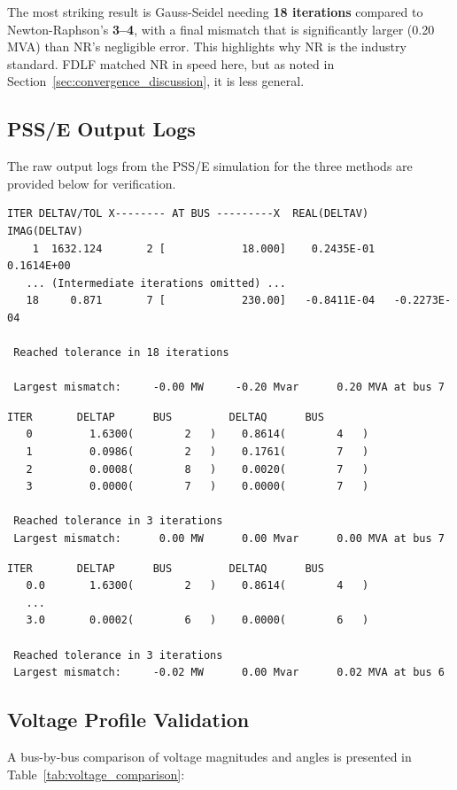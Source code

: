 \documentclass[12pt, a4paper]{article}
\begin{document}
The most striking result is Gauss-Seidel needing \textbf{18 iterations} compared to Newton-Raphson's \textbf{3--4}, with a final mismatch that is significantly larger (0.20 MVA) than NR's negligible error. This highlights why NR is the industry standard. FDLF matched NR in speed here, but as noted in Section~\ref{sec:convergence_discussion}, it is less general.

\subsection{PSS/E Output Logs}
The raw output logs from the PSS/E simulation for the three methods are provided below for verification.

\begin{lstlisting}[caption={PSS/E Gauss-Seidel Output}, label={lst:psse_gs}]
 ITER DELTAV/TOL X-------- AT BUS ---------X  REAL(DELTAV)  IMAG(DELTAV)
    1  1632.124       2 [            18.000]    0.2435E-01    0.1614E+00
   ... (Intermediate iterations omitted) ...
   18     0.871       7 [            230.00]   -0.8411E-04   -0.2273E-04

 Reached tolerance in 18 iterations

 Largest mismatch:     -0.00 MW     -0.20 Mvar      0.20 MVA at bus 7
\end{lstlisting}

\begin{lstlisting}[caption={PSS/E Newton-Raphson Output}, label={lst:psse_nr}]
  ITER       DELTAP      BUS         DELTAQ      BUS
   0         1.6300(        2   )    0.8614(        4   )
   1         0.0986(        2   )    0.1761(        7   )
   2         0.0008(        8   )    0.0020(        7   )
   3         0.0000(        7   )    0.0000(        7   )

 Reached tolerance in 3 iterations
 Largest mismatch:      0.00 MW      0.00 Mvar      0.00 MVA at bus 7
\end{lstlisting}

\begin{lstlisting}[caption={PSS/E Fast Decoupled Output}, label={lst:psse_fd}]
  ITER       DELTAP      BUS         DELTAQ      BUS
   0.0       1.6300(        2   )    0.8614(        4   )
   ...
   3.0       0.0002(        6   )    0.0000(        6   )

 Reached tolerance in 3 iterations
 Largest mismatch:     -0.02 MW      0.00 Mvar      0.02 MVA at bus 6
\end{lstlisting}

\subsection{Voltage Profile Validation}
A bus-by-bus comparison of voltage magnitudes and angles is presented in Table~\ref{tab:voltage_comparison}:
\end{document}
